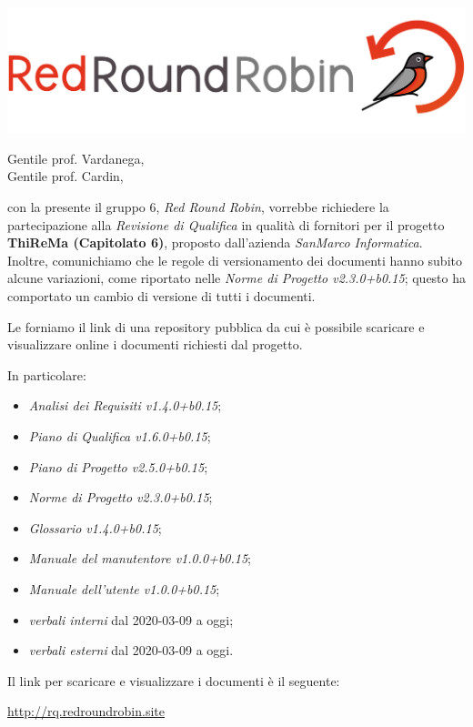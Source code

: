 \documentclass[12pt]{letter}
\date{13 aprile 2020}
\begin{document}
\begin{letter}{ }

\includegraphics[scale=0.17]{images/logo.png}

\opening{Gentile prof. Vardanega,\\ Gentile prof. Cardin, }

con la presente il gruppo 6, \textit{Red Round Robin}, vorrebbe richiedere la partecipazione alla \textit{Revisione di Qualifica} in qualità di fornitori per il progetto \textbf{ThiReMa (Capitolato 6)}, proposto dall'azienda \textit{SanMarco Informatica}.
\newline
Inoltre, comunichiamo che le regole di versionamento dei documenti hanno subito alcune variazioni, come riportato nelle \textit{Norme di Progetto v2.3.0+b0.15}; questo ha comportato un cambio di versione di tutti i documenti.

Le forniamo il link di una repository pubblica da cui è possibile scaricare e visualizzare online i documenti richiesti dal progetto.

In particolare:

\begin{itemize}
  \item \textit{Analisi dei Requisiti v1.4.0+b0.15};
	\item \textit{Piano di Qualifica v1.6.0+b0.15};
	\item \textit{Piano di Progetto v2.5.0+b0.15};
	\item \textit{Norme di Progetto v2.3.0+b0.15};
	\item \textit{Glossario v1.4.0+b0.15};
	\item \textit{Manuale del manutentore v1.0.0+b0.15};
	\item \textit{Manuale dell'utente v1.0.0+b0.15};
	\item \textit{verbali interni} dal 2020-03-09 a oggi;
	\item \textit{verbali esterni} dal 2020-03-09 a oggi.
\end{itemize}

Il link per scaricare e visualizzare i documenti è il seguente:

\begin{center}
\href{https://drive.google.com/drive/folders/1iKZ3SAwq-iA_hfYzytVylcceP-fwv8xA?usp=sharing}{http://rq.redroundrobin.site}
\end{center}


\end{letter}
\end{document}
